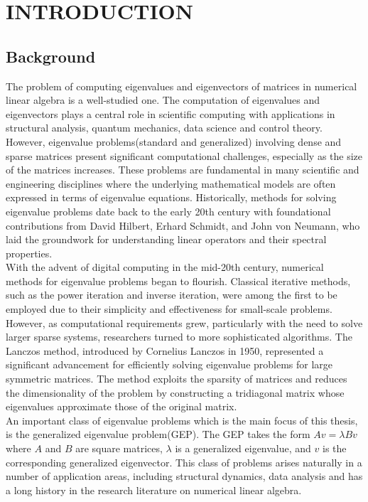 \chapter{INTRODUCTION}
\newtheorem{theorem}{Theorem}[section]
\newtheorem{definition}{Definition}[section]
\section{Background}
The problem of computing eigenvalues and eigenvectors of matrices in numerical linear algebra is a well-studied one. The computation of eigenvalues and eigenvectors plays a central role in scientific computing with applications in structural analysis, quantum mechanics, data science and control theory. However, eigenvalue problems(standard and generalized)  involving dense and sparse matrices present significant computational challenges, especially as the size of the matrices increases. These problems are fundamental in many scientific and engineering disciplines where the underlying mathematical models are often expressed in terms of eigenvalue equations. Historically, methods for solving eigenvalue problems date back to the early 20th century with foundational contributions from David Hilbert, Erhard Schmidt, and John von Neumann, who laid the groundwork for understanding linear operators and their spectral properties.\\
With the advent of digital computing in the mid-20th century, numerical methods for eigenvalue problems began to flourish. Classical iterative methods, such as the power iteration and inverse iteration, were among the first to be employed due to their simplicity and effectiveness for small-scale problems. However, as computational requirements grew, particularly with the need to solve larger sparse systems, researchers turned to more sophisticated algorithms. The Lanczos method, introduced by Cornelius Lanczos in 1950, represented a significant advancement for efficiently solving eigenvalue problems for large symmetric matrices. The method exploits the sparsity of matrices and reduces the dimensionality of the problem by constructing a tridiagonal matrix whose eigenvalues approximate those of the original matrix.\\
An important class of eigenvalue problems which is the main focus of this thesis, is the generalized eigenvalue problem(GEP). The GEP takes the form $Av=\lambda Bv$ where $A$ and $B$ are square matrices, $\lambda$ is a generalized eigenvalue, and $v$ is the corresponding generalized eigenvector. This class of problems arises naturally in a number of application areas, including structural dynamics, data analysis and has a long history in the research literature on numerical linear algebra.
